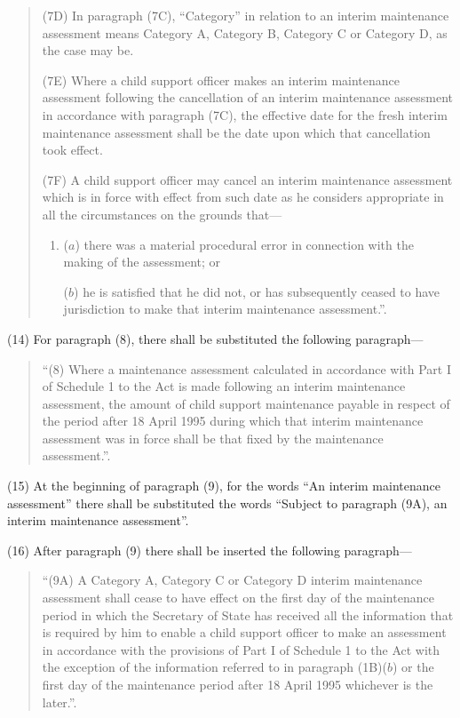 \documentclass[a4paper]{article}
\begin{document}
\begin{quotation}
(7D) In paragraph (7C), “Category” in relation to an interim maintenance assessment means Category A, Category B, Category C or Category D, as the case may be.

(7E) Where a child support officer makes an interim maintenance assessment following the cancellation of an interim maintenance assessment in accordance with paragraph (7C), the effective date for the fresh interim maintenance assessment shall be the date upon which that cancellation took effect.

(7F) A child support officer may cancel an interim maintenance assessment which is in force with effect from such date as he considers appropriate in all the circumstances on the grounds that—
\begin{enumerate}\item[]
($a$) there was a material procedural error in connection with the making of the assessment; or

($b$) he is satisfied that he did not, or has subsequently ceased to have jurisdiction to make that interim maintenance assessment.”.
\end{enumerate}
\end{quotation}

(14) For paragraph (8), there shall be substituted the following paragraph—
\begin{quotation}
“(8) Where a maintenance assessment calculated in accordance with Part I of Schedule 1 to the Act is made following an interim maintenance assessment, the amount of child support maintenance payable in respect of the period after 18 April 1995 during which that interim maintenance assessment was in force shall be that fixed by the maintenance assessment.”.
\end{quotation}

(15) At the beginning of paragraph (9), for the words “An interim maintenance assessment” there shall be substituted the words “Subject to paragraph (9A), an interim maintenance assessment”.

(16) After paragraph (9) there shall be inserted the following paragraph—
\begin{quotation}
“(9A) A Category A, Category C or Category D interim maintenance assessment shall cease to have effect on the first day of the maintenance period in which the Secretary of State has received all the information that is required by him to enable a child support officer to make an assessment in accordance with the provisions of Part I of Schedule 1 to the Act with the exception of the information referred to in paragraph (1B)($b$) or the first day of the maintenance period after 18 April 1995 whichever is the later.”.
\end{quotation}
\end{document}
